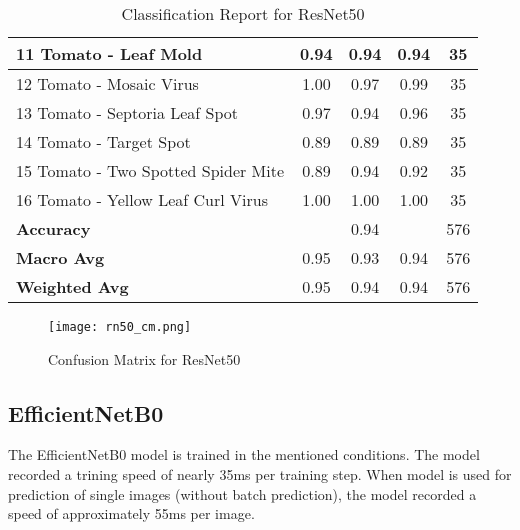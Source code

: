 \begin{table}[h!]
{\begin{tabular}{|l|c|c|c|c|}
    11 Tomato - Leaf Mold                             & 0.94               & 0.94            & 0.94              & 35               \\ \hline
    12 Tomato - Mosaic Virus                          & 1.00               & 0.97            & 0.99              & 35               \\ \hline
    13 Tomato - Septoria Leaf Spot                    & 0.97               & 0.94            & 0.96              & 35               \\ \hline
    14 Tomato - Target Spot                           & 0.89               & 0.89            & 0.89              & 35               \\ \hline
    15 Tomato - Two Spotted Spider Mite               & 0.89               & 0.94            & 0.92              & 35               \\ \hline
    16 Tomato - Yellow Leaf Curl Virus                & 1.00               & 1.00            & 1.00              & 35               \\ \hline
    \textbf{Accuracy}                                 & \multicolumn{3}{c|}{0.94}            & 576              \\ \hline
    \textbf{Macro Avg}                                & 0.95               & 0.93            & 0.94              & 576              \\ \hline
    \textbf{Weighted Avg}                             & 0.95               & 0.94            & 0.94              & 576              \\ \hline
    \end{tabular}%
    }
    \caption{Classification Report for ResNet50}
    \label{tab:classification_report_rn50}
    \end{table}

    \begin{figure}[h!]
        \centering
        \texttt{[image: rn50\_cm.png]}
        \caption{Confusion Matrix for ResNet50}
        \label{fig:rn50_cm}
    \end{figure}

    
\subsection{EfficientNetB0}

The EfficientNetB0 model is trained in the mentioned conditions. The model recorded a trining speed of nearly 35ms per training step. When model is used for prediction of single images (without batch prediction), the model recorded a speed of approximately 55ms per image. 

